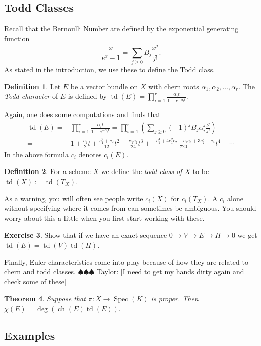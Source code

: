 \documentclass[12pt]{article}
\numberwithin{equation}{section}
\newtheorem{theorem}{Theorem}[subsection]
\theoremstyle{definition}
\newtheorem{definition}[theorem]{Definition}
\newtheorem{exercise}[theorem]{Exercise}
\theoremstyle{remark}
\newcommand{\Spec}{\operatorname{Spec}}
\newcommand{\ch}{\operatorname{ch}}
\newcommand{\td}{\operatorname{td}}
\newcommand{\taylor}[1]{{\color{blue} \sf $\spadesuit\spadesuit\spadesuit$ Taylor: [#1]}}
\begin{document}
\subsection{Todd Classes}
Recall that the Bernoulli Number are defined by the exponential generating function 
$$\frac{x}{e^x-1} = \sum_{j\geq 0} B_j \frac{x^j}{j!}.$$
As stated in the introduction, we use these to define the Todd class. 
\begin{definition}
	Let $E$ be a vector bundle on $X$ with chern roots $\alpha_1,\alpha_2,\ldots,\alpha_r$.
	The \emph{Todd character} of $E$ is defined by $\td(E) = \prod_{i=1}^r \frac{\alpha_i t}{1 - e^{-\alpha_i t}}$.
\end{definition}
Again, one does some computations and finds that 
\begin{align*}
\td(E) =& \prod_{i=1}^r \frac{\alpha_i t}{1 - e^{-\alpha_it}} = \prod_{i=1}^r \left( \sum_{j\geq 0} (-1)^j B_j  \alpha_i^j \frac{t^j}{j!}\right) \\
=& 1 + \frac{c_1}{2}t + \frac{c_1^2 +c_2}{12}t^2 + \frac{c_1c_2}{24}t^3 + \frac{-c_1^4 + 4 c_1^2 c_2 + c_1c_3 + 3c_2^2 - c_4}{720}t^4 + \cdots 
\end{align*}
In the above formula $c_i$ denotes $c_i(E)$. 
\begin{definition}
	For a scheme $X$ we define the \emph{todd class of $X$} to be $\td(X):= \td(T_X)$.
\end{definition}
As a warning, you will often see people write $c_i(X)$ for $c_i(T_X)$. 
A $c_i$ alone without specifying where it comes from can sometimes be ambiguous. 
You should worry about this a little when you first start working with these.

\begin{exercise}
	Show that if we have an exact sequence $0\to V \to E \to H \to 0$ we get $\td(E) = \td(V)\td(H)$.
\end{exercise}

Finally, Euler characteristics come into play because of how they are related to chern and todd classes. \taylor{I need to get my hands dirty again and check some of these}
\begin{theorem}
	Suppose that $\pi:X\to \Spec(K)$ is proper. 
	Then $ \chi(E) = \deg(\ch(E)\td(E)).$
\end{theorem}

\subsection{Examples}
\end{document}
